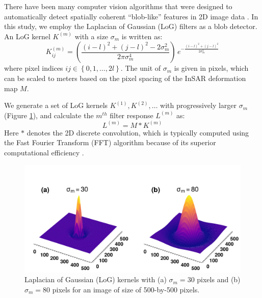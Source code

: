 There have been many computer vision algorithms that were designed to automatically detect spatially coherent ``blob-like'' features in 2D image data \cite{Lindeberg1993DetectingSalientBlob, Lindeberg1998FeatureDetectionAutomatic, Lowe2004DistinctiveImageFeatures}. In this study, we employ the Laplacian of Gaussian (LoG) filters as a blob detector. An LoG kernel $K^{(m)}$ with a size $\sigma_m$ is written as:
\begin{equation}
	K^{(m)}_{ij} = \left(\frac{(i - l)^2 + (j - l)^2 - 2\sigma_m^2}{2 \pi \sigma_m^4}\right) \, e^{-\frac{ (i - l)^2 + (j - l)^2}{2 \sigma_m^2}} \label{eq:log-kernel}
\end{equation}
where pixel indices $ij  \in \left\lbrace 0, 1, \ldots, 2l \right\rbrace$. The unit of $\sigma_m$ is given in pixels, which can be scaled to meters based on the pixel spacing of the InSAR deformation map $M$.


We generate a set of LoG kernels $K^{(1)}, K^{(2)}, \ldots$ with progressively larger $\sigma_m$ (Figure \ref{fig:log-kernel}), and calculate the $m^{th}$ filter response $ L^{(m)} $ as:
\begin{equation}
	L^{(m)} = M \ast K^{(m)}  \label{eq:log-layer-conv}
\end{equation}
Here $*$ denotes the 2D discrete convolution, which is typically computed using the Fast Fourier Transform (FFT) algorithm because of its superior computational efficiency \cite{Szeliski2022ComputerVision}.


\begin{figure}[hbt!]
	\centering
	\includegraphics[width=0.98\linewidth]{paper2/figures/figure1_log_examples.pdf}
	\caption[Laplacian of Gaussian (LoG) kernels]{
		Laplacian of Gaussian (LoG) kernels with (a) $\sigma_m=30$ pixels and (b) $\sigma_m=80$ pixels for an image of size of 500-by-500 pixels.
	}
	\label{fig:log-kernel}
\end{figure}

